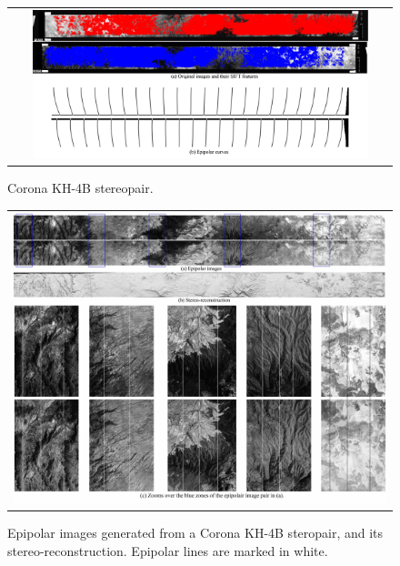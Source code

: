 \documentclass{ipol}
\begin{document}
\begin{figure}[h!]
\centering
\begin{tabular}{c}
\includegraphics[width=0.9\textwidth]{FIGS/corona__sift_curves.jpg}
\end{tabular}
\caption{Corona KH-4B stereopair.}
\label{ExpCoronaSIFT}
\end{figure}
%
\begin{figure}[h!]
\centering
\begin{tabular}{c}
\includegraphics[width=\textwidth]{FIGS/Corona_epi_all.jpg}
\end{tabular}
\caption{Epipolar images generated from a Corona KH-4B steropair, and its stereo-reconstruction. Epipolar lines are marked in white.}
 
\label{ExpCoronaEpi}
\end{figure}



    
    
\end{document}
